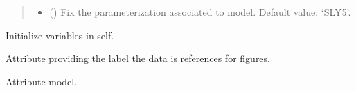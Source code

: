 \documentclass[letterpaper,10pt,english]{sphinxmanual}
\begin{document}
\begin{fulllineitems}
\begin{quote}
\begin{description}
\begin{itemize}
\item {} 
\sphinxAtStartPar
{} (\sphinxstyleliteralemphasis{\sphinxupquote{, }}) \textendash{} Fix the parameterization associated to model.     Default value: ‘SLY5’.

\end{itemize}

\end{description}\end{quote}

\sphinxAtStartPar
{}

\begin{fulllineitems}
\label{\detokenize{source/api/setup_eos_pheno:nucleardatapy.setup_eos_pheno.SetupEOSPheno.init_self}}
\pysigstartsignatures
\pysiglinewithargsret
{}
{}
{}
\pysigstopsignatures
\sphinxAtStartPar
Initialize variables in self.

\end{fulllineitems}


\begin{fulllineitems}
\label{\detokenize{source/api/setup_eos_pheno:nucleardatapy.setup_eos_pheno.SetupEOSPheno.label}}
\pysigstartsignatures
\pysigline
{}
\pysigstopsignatures
\sphinxAtStartPar
Attribute providing the label the data is references for figures.

\end{fulllineitems}


\begin{fulllineitems}
\label{\detokenize{source/api/setup_eos_pheno:nucleardatapy.setup_eos_pheno.SetupEOSPheno.model}}
\pysigstartsignatures
\pysigline
{}
\pysigstopsignatures
\sphinxAtStartPar
Attribute model.


\end{fulllineitems}
\end{fulllineitems}
\end{document}
